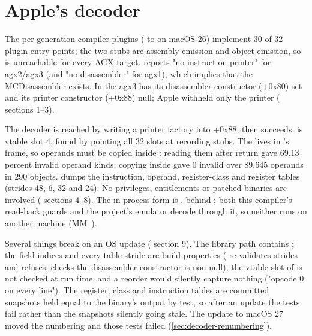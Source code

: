 \section{Apple's decoder}\label{sec:decoder}

The per-generation compiler plugins ( to  on macOS 26) implement 30 of
32 plugin entry points; the two stubs are assembly emission and object emission, so  is unreachable for every AGX
target.  reports "no instruction printer" for agx2/agx3 (and "no disassembler" for agx1), which implies
that the MCDisassembler exists. In  the agx3  has its
disassembler constructor (+0x80) set and its printer constructor (+0x88) null; Apple withheld only the printer
( sections 1–3).

The decoder is reached by writing a printer factory into +0x88;  then succeeds.  is vtable slot 4,
found by pointing all 32 slots at recording stubs. The  lives in 's frame, so operands must
be copied inside : reading them after return gave 69.13 percent invalid operand kinds; copying inside gave 0
invalid over 89,645 operands in 290 objects.  dumps the instruction,
operand, register-class and register tables (strides 48, 6, 32 and 24). No privileges, entitlements or patched binaries
are involved ( sections 4–8). The in-process form is , behind
; both this compiler's read-back guards and the project's emulator decode through it, so neither
runs on another machine (MM~).

Several things break on an OS update ( section 9). The library path contains ; the
 field indices and every table stride are build properties ( re-validates strides and refuses;
 checks the disassembler constructor is non-null); the vtable slot of  is not checked at run time,
and a reorder would silently capture nothing ("opcode 0 on every line"). The register, class and instruction tables are
committed snapshots held equal to the binary's output by test, so after an update the tests fail rather than the
snapshots silently going stale. The update to macOS 27 moved the numbering and those tests failed
(\cref{sec:decoder-renumbering}).

